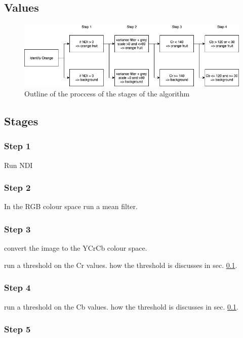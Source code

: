 \documentclass[conference]{IEEEtran}
\begin{document}
\subsection{Values} \label{values}


\begin{figure}[htbp]
\centerline{\includegraphics[width=\textwidth]{algo_stages}}
\caption{Outline of the proccess of the stages of the algorithm}
\label{fig}
\end{figure}

\subsection{Stages}



\subsubsection{Step 1}
Run NDI 

\subsubsection{Step 2}
In the RGB colour space run a mean filter.

\subsubsection{Step 3}
convert the image to the YCrCb colour space.

run a threshold on the Cr values. how the threshold is discusses in sec. \ref{values}. 


\subsubsection{Step 4}

run a threshold on the Cb values. how the threshold is discusses in sec. \ref{values}. 

\subsubsection{Step 5}
\end{document}
